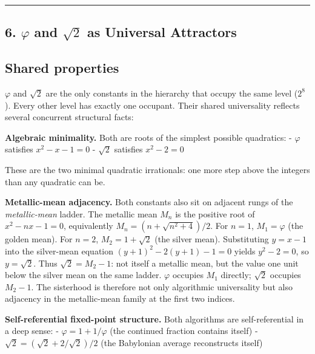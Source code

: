\documentclass[12pt]{article}
\begin{document}
\begin{center}\rule{0.5\linewidth}{0.5pt}\end{center}

\subsection{\texorpdfstring{6. \(\varphi\) and \(\sqrt{2}\) as Universal
Attractors}{6. \textbackslash varphi and \textbackslash sqrt\{2\} as Universal Attractors}}\label{varphi-and-sqrt2-as-universal-attractors}

\subsection{Shared properties}\label{shared-properties}

\(\varphi\) and \(\sqrt{2}\) are the only constants in the hierarchy
that occupy the same level (\(2^8\)). Every other level has exactly one
occupant. Their shared universality reflects several concurrent
structural facts:

\textbf{Algebraic minimality.} Both are roots of the simplest possible
quadratics: - \(\varphi\) satisfies \(x^2 - x - 1 = 0\) - \(\sqrt{2}\)
satisfies \(x^2 - 2 = 0\)

These are the two minimal quadratic irrationals: one more step above the
integers than any quadratic can be.

\textbf{Metallic-mean adjacency.} Both constants also sit on adjacent
rungs of the \emph{metallic-mean} ladder. The metallic mean \(M_n\) is
the positive root of \(x^2 - nx - 1 = 0\), equivalently
\(M_n = (n + \sqrt{n^2 + 4})/2\). For \(n = 1\), \(M_1 = \varphi\) (the
golden mean). For \(n = 2\), \(M_2 = 1 + \sqrt{2}\) (the silver mean).
Substituting \(y = x - 1\) into the silver-mean equation
\((y+1)^2 - 2(y+1) - 1 = 0\) yields \(y^2 - 2 = 0\), so
\(y = \sqrt{2}\). Thus \(\sqrt{2} = M_2 - 1\): not itself a metallic
mean, but the value one unit below the silver mean on the same ladder.
\(\varphi\) occupies \(M_1\) directly; \(\sqrt{2}\) occupies
\(M_2 - 1\). The sisterhood is therefore not only algorithmic
universality but also adjacency in the metallic-mean family at the first
two indices.

\textbf{Self-referential fixed-point structure.} Both algorithms are
self-referential in a deep sense: - \(\varphi = 1 + 1/\varphi\) (the
continued fraction contains itself) -
\(\sqrt{2} = (\sqrt{2} + 2/\sqrt{2})/2\) (the Babylonian average
reconstructs itself)
\end{document}
